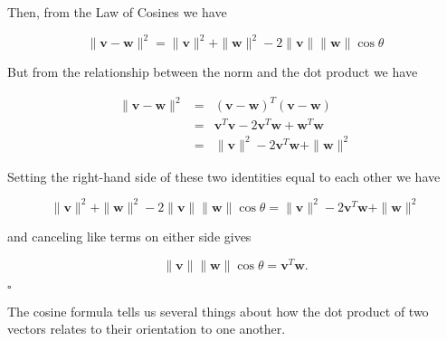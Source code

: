 \documentclass[12pt]{article}
\newcommand{\nin}{\noindent}
\newcommand{\nn}{\nonumber}
\newcommand{\vthree}{\vspace{3mm}}
\newcommand{\myp}[1]{\left( #1 \right)}
\newcommand{\beq}{\begin{eqnarray}}
\newcommand{\eeq}{\end{eqnarray}}
\newcommand{\bw}{\mathbf{w}}
\newcommand{\bv}{\mathbf{v}}
\begin{document}
\begin{center}
\end{center}

\nin Then, from the Law of Cosines we have

\[
\|\bv - \bw\|^2 = \|\bv\|^2 + \|\bw\|^2 - 2\|\bv\|\|\bw\|\cos \theta
\]

\vthree

\nin But from the relationship between the norm and the dot product we have

\beq
\nn \|\bv - \bw\|^2 &=& \myp{\bv-\bw}^T\myp{\bv-\bw} \\
\nn                 &=& \bv^T\bv - 2\bv^T\bw + \bw^T\bw \\
\nn                 &=& \|\bv\|^2 - 2\bv^T\bw + \|\bw\|^2
\eeq

\clearpage

\nin Setting the right-hand side of these two identities equal to each other we have

\[
\|\bv\|^2 + \|\bw\|^2 - 2\|\bv\|\|\bw\|\cos \theta =  \|\bv\|^2 - 2\bv^T\bw + \|\bw\|^2
\]

\nin and canceling like terms on either side gives

\[
\|\bv\|\|\bw\|\cos \theta =  \bv^T\bw.
\]

\hfill $\square$

\clearpage

The cosine formula tells us several things about how the dot product of two vectors relates to their orientation to one another.
\end{document}
